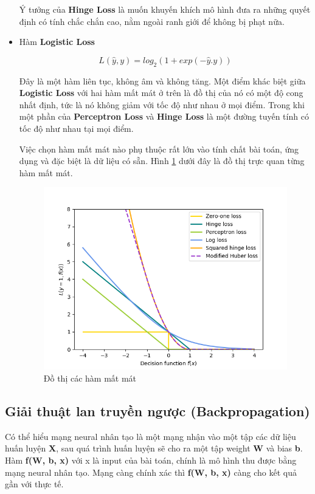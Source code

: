 \begin{itemize}
Ý tưởng của \textbf{Hinge Loss} là muốn khuyến khích mô hình đưa ra những quyết định có tính chắc chắn cao, nằm ngoài ranh giới để không bị phạt nữa.
	\item Hàm \textbf{Logistic Loss}
	\begin{center}
		\begin{equation}
			L(\hat{y}, y) = log_2(1 + exp(-\hat{y}.y))
		\end{equation}
	\end{center}
	Đây là một hàm liên tục, không âm và không tăng. Một điểm khác biệt giữa \textbf{Logistic Loss} với hai hàm mất mát ở trên là đồ thị của nó có một độ cong nhất định, tức là nó không giảm với tốc độ như nhau ở mọi điểm. Trong khi một phần của \textbf{Perceptron Loss} và \textbf{Hinge Loss} là một đường tuyến tính có tốc độ như nhau tại mọi điểm.
	
	Việc chọn hàm mất mát nào phụ thuộc rất lớn vào tính chất bài toán, ứng dụng và đặc biệt là dữ liệu có sẵn. Hình \ref{chap2:loss_function} dưới đây là đồ thị trực quan từng hàm mất mát.
	\begin{center}
    \begin{figure}[H]
    \centering
    \includegraphics[width=0.7\columnwidth]{images/chap2/loss_plot.png}
    \caption{Đồ thị các hàm mất mát}
    \label{chap2:loss_function}
    \end{figure}
\end{center}
\end{itemize}

\subsection{Giải thuật lan truyền ngược (Backpropagation)}
Có thể hiểu mạng neural nhân tạo là một mạng nhận vào một tập các dữ liệu huấn luyện \textbf{X}, sau quá trình huấn luyện sẽ cho ra một tập weight \textbf{W} và bias \textbf{b}. Hàm \textbf{f(W, b, x)}  với x là input của bài toán, chính là mô hình thu được bằng mạng neural nhân tạo. Mạng càng chính xác thì \textbf{f(W, b, x)} càng cho kết quả gần với thực tế.


